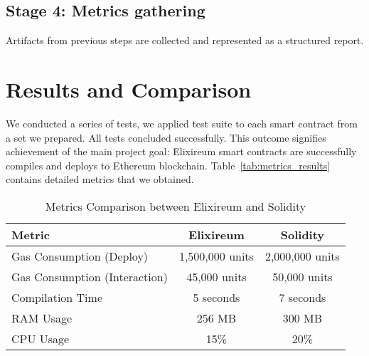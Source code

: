 \subsection*{Stage 4: Metrics gathering}
Artifacts from previous steps are collected and represented as a structured report.



\section{Results and Comparison}
\label{sec:results_and_comparison}
We conducted a series of tests, we applied test suite to each smart contract from a set we prepared. All tests concluded successfully. This outcome signifies achievement of the main project goal: Elixireum smart contracts are successfully compiles and deploys to Ethereum blockchain. Table~\ref{tab:metrics_results} contains detailed metrics that we obtained.

\begin{table}[ht]
  \label{tab:metrics_results}
  \caption{Metrics Comparison between Elixireum and Solidity}
  \centering
  \begin{tabular}{|l|c|c|}
  \hline
  \textbf{Metric} & \textbf{Elixireum} & \textbf{Solidity} \\
  \hline
  Gas Consumption (Deploy) & 1,500,000 units & 2,000,000 units \\
  \hline
  Gas Consumption (Interaction) & 45,000 units & 50,000 units \\
  \hline
  Compilation Time & 5 seconds & 7 seconds \\
  \hline
  RAM Usage & 256 MB & 300 MB \\
  \hline
  CPU Usage & 15\% & 20\% \\
  \hline
  \end{tabular}
  \label{table:metrics_comparison}
\end{table}

